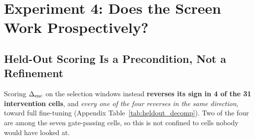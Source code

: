 \section{Experiment 4: Does the Screen Work Prospectively?}
\label{sec:exp4}

\subsection{Held-Out Scoring Is a Precondition, Not a Refinement}
\label{sec:analysis:heldout}
Scoring
$\Delta_\text{enc}$ on the selection windows instead \textbf{reverses its
sign in 4 of the 31 intervention cells}, and \emph{every one of the four
reverses in the same direction}, toward full fine-tuning
(Appendix Table~\ref{tab:heldout_decomp}).
Two
of the four are among the seven gate-passing cells, so this is not confined to
cells nobody would have looked at.

